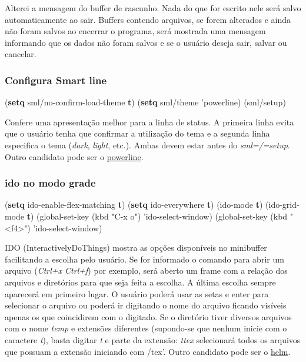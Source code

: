\documentclass[]{article}
\newenvironment{Shaded}{}{}
\newcommand{\KeywordTok}[1]{\textcolor[rgb]{0.00,0.44,0.13}{\textbf{{#1}}}}
\newcommand{\StringTok}[1]{\textcolor[rgb]{0.25,0.44,0.63}{{#1}}}
\newcommand{\NormalTok}[1]{{#1}}
\begin{document}
Alterei a mensagem do buffer de rascunho. Nada do que for escrito nele
será salvo automaticamente ao sair. Buffers contendo arquivos, se forem
alterados e ainda não foram salvos ao encerrar o programa, será mostrada
uma mensagem informando que os dados não foram salvos e se o usuário
deseja sair, salvar ou cancelar.

\subsubsection{Configura Smart line}\label{configura-smart-line}

\begin{Shaded}
\begin{Highlighting}[]
\NormalTok{(}\KeywordTok{setq} \NormalTok{sml/no-confirm-load-theme }\KeywordTok{t}\NormalTok{)}
\NormalTok{(}\KeywordTok{setq} \NormalTok{sml/theme 'powerline)}
\NormalTok{(sml/setup)}
\end{Highlighting}
\end{Shaded}

Confere uma apresentação melhor para a linha de status. A primeira linha
evita que o usuário tenha que confirmar a utilização do tema e a segunda
linha especifica o tema (\emph{dark}, \emph{light}, etc.). Ambas devem
estar antes do \emph{sml=/=setup}. Outro candidato pode ser o
\href{https://github.com/milkypostman/powerline}{powerline}.

\subsubsection{ido no modo grade}\label{ido-no-modo-grade}

\begin{Shaded}
\begin{Highlighting}[]
\NormalTok{(}\KeywordTok{setq} \NormalTok{ido-enable-flex-matching }\KeywordTok{t}\NormalTok{)}
\NormalTok{(}\KeywordTok{setq} \NormalTok{ido-everywhere }\KeywordTok{t}\NormalTok{)}
\NormalTok{(ido-mode }\KeywordTok{t}\NormalTok{)}
\NormalTok{(ido-grid-mode }\KeywordTok{t}\NormalTok{)}
\NormalTok{(global-set-key (kbd }\StringTok{"C-x o"}\NormalTok{) 'ido-select-window)}
\NormalTok{(global-set-key (kbd }\StringTok{"<f4>"}\NormalTok{) 'ido-select-window)}
\end{Highlighting}
\end{Shaded}

IDO (InteractivelyDoThings) mostra as opções disponíveis no minibuffer
facilitando a escolha pelo usuário. Se for informado o comando para
abrir um arquivo (\emph{Ctrl+x Ctrl+f}) por exemplo, será aberto um
frame com a relação dos arquivos e diretórios para que seja feita a
escolha. A última escolha sempre aparecerá em primeiro lugar. O usuário
poderá usar as setas e enter para selecionar o arquivo ou poderá ir
digitando o nome do arquivo ficando visíveis apenas os que coincidirem
com o digitado. Se o diretório tiver diversos arquivos com o nome
\emph{temp} e extensões diferentes (supondo-se que nenhum inicie com o
caractere \emph{t}), basta digitar \emph{t} e parte da extensão:
\emph{ttex} selecionará todos os arquivos que possuam a extensão
iniciando com /tex'. Outro candidato pode ser o
\href{https://github.com/emacs-helm/helm}{helm}.
\end{document}
